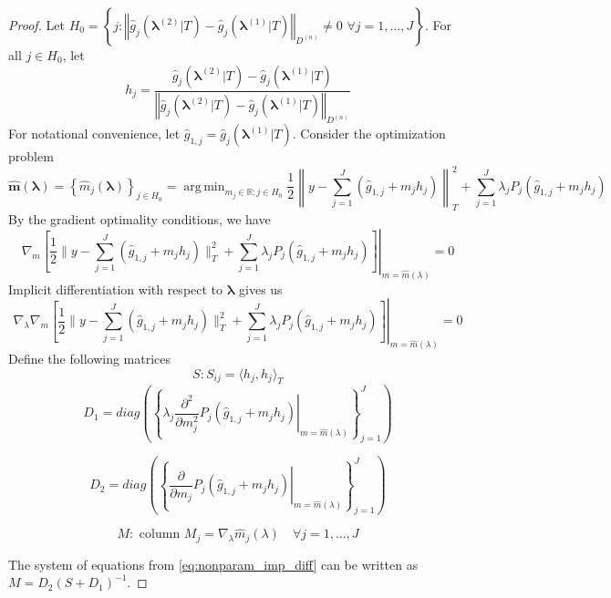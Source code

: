 \documentclass[12pt]{article}
\DeclareMathOperator*{\argmin}{arg\,min}
\begin{document}
\begin{proof}
	Let $H_{0} = \left \{
	j:\left\Vert \hat{g}_{j}(\boldsymbol{\lambda}^{(2)}|T)-\hat{g}_{j}(\boldsymbol{\lambda}^{(1)}|T)\right\Vert _{D^{(n)}} \ne 0\,\, \forall j = 1,...,J
	\right \}$.
	For all $j \in H_0$, let 
	\[
	h_{j}=
	\frac{\hat{g}_{j}(\boldsymbol{\lambda}^{(2)}|T)-\hat{g}_{j}(\boldsymbol{\lambda}^{(1)}|T)}{\left\Vert \hat{g}_{j}(\boldsymbol{\lambda}^{(2)}|T)-\hat{g}_{j}(\boldsymbol{\lambda}^{(1)}|T)\right\Vert _{D^{(n)}}}
	\]
	For notational convenience, let $\hat{g}_{1,j} = \hat{g}_{j}(\boldsymbol{\lambda}^{(1)}|T)$. Consider the optimization problem
	\begin{equation}
	\hat{\boldsymbol{m}}(\boldsymbol{\lambda})=\left\{ \hat{m}_{j}(\boldsymbol{\lambda})\right\} _{j\in H_0}
	=\argmin_{m_{j} \in \mathbb{R}: j\in H_0}
	\frac{1}{2}
	\left \|y-\sum_{j=1}^{J}\left(\hat{g}_{1,j}+m_{j}h_{j}\right) \right \|_{T}^{2}
	+\sum_{j=1}^{J}\lambda_{j}
	P_{j} \left (\hat{g}_{1,j}+m_{j}h_{j} \right )
	\end{equation}
	By the gradient optimality conditions, we have
	\begin{equation}
	\nabla_{m} \left .
	\left[\frac{1}{2}\|y-\sum_{j=1}^{J}\left(\hat{g}_{1,j}+m_{j}h_{j}\right)\|_{T}^{2}+\sum_{j=1}^{J}\lambda_{j}P_{j}(\hat{g}_{1,j}+m_{j}h_{j})\right] \right |_{m=\hat{m}(\lambda)}
	= 0
	\label{eq:nonparam_grad_opt}
	\end{equation}
	Implicit differentiation with respect to $\boldsymbol{\lambda}$ gives us
	\begin{equation}
	\nabla_\lambda 
	\nabla_m
	\left . \left[
	\frac{1}{2}\|y-\sum_{j=1}^{J}\left(\hat{g}_{1,j}+m_{j}h_{j}\right)\|_{T}^{2}+\sum_{j=1}^{J}\lambda_{j}P_{j}(\hat{g}_{1,j}+m_{j}h_{j})\right] \right |_{m=\hat{m}(\lambda)}
	= 0
	\label{eq:nonparam_imp_diff}
	\end{equation}
	Define the following matrices
	\[
	S:S_{ij}=\langle h_{j},h_{j}\rangle_{T}
	\]
	\[
	D_{1}=diag\left(
	\left \{
	\left.\lambda_{j}\frac{\partial^{2}}{\partial m_{j}^{2}}P_{j}(\hat{g}_{1,j}+m_{j}h_{j})\right|_{m=\hat{m}(\lambda)}
	\right \}_{j=1}^J
	\right)
	\]
	
	
	\[
	D_{2}=diag\left(\left \{ \left.
	\frac{\partial}{\partial m_{j}}P_{j}(\hat{g}_{1,j}+m_{j}h_{j})\right|_{m=\hat{m}(\lambda)}
	\right \}_{j=1}^J
	\right)
	\]
	
	
	\[
	M:\mbox{ column }M_{j}=\nabla_{\lambda}\hat{m}_{j}(\lambda) \quad \forall j=1,...,J
	\]
	
	
	The system of equations from \eqref{eq:nonparam_imp_diff} can be written as  $M=D_{2}\left(S+D_{1}\right)^{-1}$.
	

\end{proof}
\end{document}
